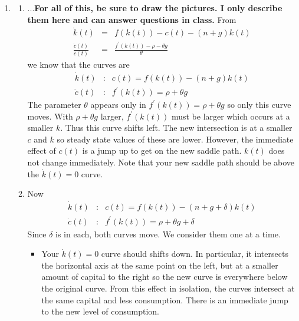 \documentclass{article}
\begin{document}
\begin{enumerate}
\item 

\begin{enumerate}
\item ...\textbf{For all of this, be sure to draw the pictures. I only
describe them here and can answer questions in class.} From 
\begin{eqnarray*}
\dot{k}\left( t\right)  &=&f\left( k\left( t\right) \right) -c\left(
t\right) -\left( n+g\right) k\left( t\right)  \\
\frac{\dot{c}\left( t\right) }{c\left( t\right) } &=&\frac{f^{\prime }\left(
k\left( t\right) \right) -\rho -\theta g}{\theta }
\end{eqnarray*}%
we know that the curves are  
\begin{eqnarray*}
\dot{k}\left( t\right)  &:&c\left( t\right) =f\left( k\left( t\right)
\right) -\left( n+g\right) k\left( t\right)  \\
\dot{c}\left( t\right)  &:&f^{\prime }\left( k\left( t\right) \right) =\rho
+\theta g
\end{eqnarray*}%
The parameter $\theta $ appears only in $f^{\prime }\left( k\left( t\right)
\right) =\rho +\theta g$ so only this curve moves. With $\rho +\theta g$
larger, $f^{\prime }\left( k\left( t\right) \right) $ must be larger which
occurs at a smaller $k$. Thus this curve shifts left. The new intersection
is at a smaller $c$ and $k$ so steady state values of these are lower.
However, the immediate effect of $c\left( t\right) $ is a jump up to get on
the new saddle path. $k(t)$ does not change immediately. Note that your new
saddle path should be above the $\dot{k}\left( t\right) =0$ curve. 

\item Now 
\begin{eqnarray*}
\dot{k}\left( t\right)  &:&c\left( t\right) =f\left( k\left( t\right)
\right) -\left( n+g+\delta \right) k\left( t\right)  \\
\dot{c}\left( t\right)  &:&f^{\prime }\left( k\left( t\right) \right) =\rho
+\theta g+\delta 
\end{eqnarray*}
Since $\delta $ is in each, both curves move. We consider them one at a
time. 

\begin{itemize}
\item Your $\dot{k}\left( t\right) =0$ curve should shifts down. In
particular, it intersects the horizontal axis at the same point on the left,
but at a smaller amount of capital to the right so the new curve is
everywhere below the original curve. From this effect in isolation, the
curves intersect at the same capital and less consumption. There is an
immediate jump to the new level of consumption. 


\end{itemize}
\end{enumerate}
\end{enumerate}
\end{document}
